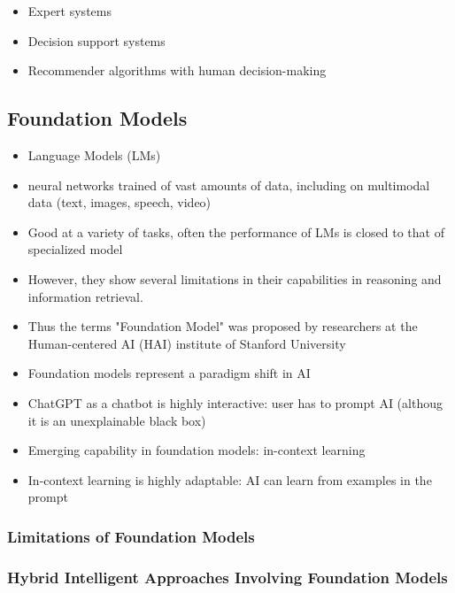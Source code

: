 \begin{itemize}
    \item Expert systems 
    \item Decision support systems
    \item Recommender algorithms with human decision-making
\end{itemize}


\subsection{Foundation Models}

\begin{itemize}
    \item Language Models (LMs)
    \item neural networks trained of vast amounts of data, including on multimodal data (text, images, speech, video)
    \item Good at a variety of tasks, often the performance of LMs is closed to that of specialized model
    \item However, they show several limitations in their capabilities in reasoning and information retrieval. 
    \item Thus the terms "Foundation Model" was proposed by researchers at the Human-centered AI (HAI) institute of Stanford University
\end{itemize}

\begin{itemize}
    \item Foundation models represent a paradigm shift in AI
    \item ChatGPT as a chatbot is highly interactive: user has to prompt AI (althoug it is an unexplainable black box)
    \item Emerging capability in foundation models: in-context learning 
    \item In-context learning is highly adaptable: AI can learn from examples in the prompt 
\end{itemize}

\subsubsection{Limitations of Foundation Models}

\subsubsection{Hybrid Intelligent Approaches Involving Foundation Models}

